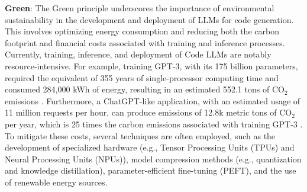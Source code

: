 \textbf{Green}: 
The Green principle underscores the importance of environmental sustainability in the development and deployment of LLMs for code generation. This involves optimizing energy consumption and reducing both the carbon footprint and financial costs associated with training and inference processes.
Currently, training, inference, and deployment of Code LLMs are notably resource-intensive. For example, training GPT-3, with its 175 billion parameters, required the equivalent of 355 years of single-processor computing time and consumed 284,000 kWh of energy, resulting in an estimated 552.1 tons of CO$_2$ emissions \cite{samsi2023words}. 
Furthermore, a ChatGPT-like application, with an estimated usage of 11 million requests per hour, can produce emissions of 12.8k metric tons of CO$_2$ per year, which is 25 times the carbon emissions associated with training GPT-3 \cite{chien2023reducing}.
To mitigate these costs, several techniques are often employed, such as the development of specialized hardware (e.g., Tensor Processing Units (TPUs) and Neural Processing Units (NPUs)), model compression methods (e.g., quantization and knowledge distillation), parameter-efficient fine-tuning (PEFT), and the use of renewable energy sources.
